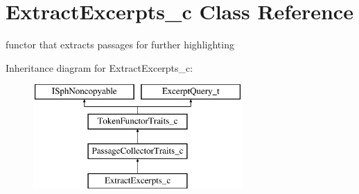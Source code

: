 \hypertarget{classExtractExcerpts__c}{\section{Extract\-Excerpts\-\_\-c Class Reference}
\label{classExtractExcerpts__c}
}


functor that extracts passages for further highlighting  


Inheritance diagram for Extract\-Excerpts\-\_\-c\-:\begin{figure}[H]
\begin{center}
\leavevmode
\includegraphics[height=4.000000cm]{classExtractExcerpts__c}
\end{center}
\end{figure}
